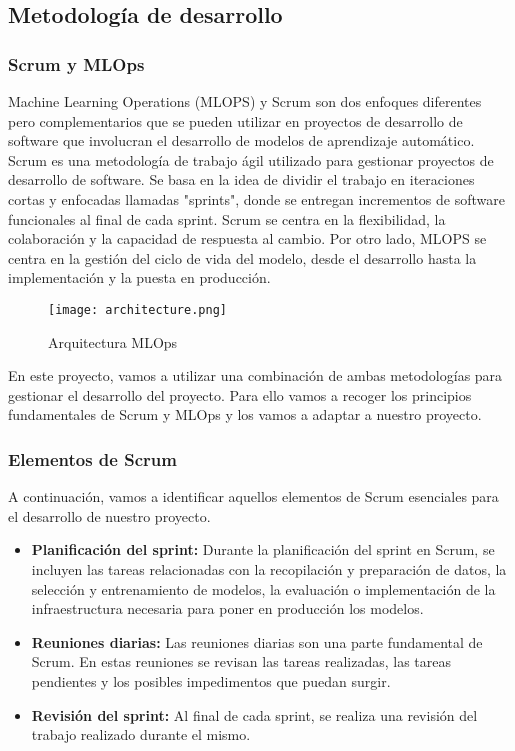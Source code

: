 \subsection{Metodología de desarrollo}
\subsubsection{Scrum y MLOps}
Machine Learning Operations (MLOPS) \cite{MLOpsKeepCoding} y Scrum \cite{Atlassian_Scrum} son dos enfoques diferentes pero complementarios que se pueden 
utilizar en proyectos de desarrollo de software que involucran el desarrollo de modelos de aprendizaje automático. 
Scrum es una metodología de trabajo ágil utilizado para gestionar proyectos de desarrollo de software. Se basa 
en la idea de dividir el trabajo en iteraciones cortas y enfocadas llamadas "sprints", donde se entregan incrementos 
de software funcionales al final de cada sprint. Scrum se centra en la flexibilidad, la colaboración y la capacidad 
de respuesta al cambio. Por otro lado, MLOPS se centra en la gestión del ciclo de vida del modelo, desde el 
desarrollo hasta la implementación y la puesta en producción.

\begin{figure}[ht]
    \centering
    \texttt{[image: architecture.png]}
    \caption{Arquitectura MLOps}
    \label{fig:architecure-mlops}
\end{figure}

En este proyecto, vamos a utilizar una combinación de ambas metodologías para gestionar el desarrollo del proyecto.
Para ello vamos a recoger los principios fundamentales de Scrum y MLOps y los vamos a adaptar a nuestro proyecto.

\subsubsection{Elementos de Scrum}
A continuación, vamos a identificar aquellos elementos de Scrum esenciales para el desarrollo de nuestro proyecto.

\begin{itemize}
      \item \textbf{Planificación del sprint:} Durante la planificación del sprint en Scrum, se incluyen las
      tareas relacionadas con la recopilación y preparación de datos, la selección y entrenamiento de modelos, 
      la evaluación o implementación de la infraestructura necesaria para poner en producción los modelos.
      \item \textbf{Reuniones diarias:} Las reuniones diarias son una parte fundamental de Scrum. En estas reuniones
      se revisan las tareas realizadas, las tareas pendientes y los posibles impedimentos que puedan surgir.
      \item \textbf{Revisión del sprint:} Al final de cada sprint, se realiza una revisión del trabajo realizado
      durante el mismo.
\end{itemize}

